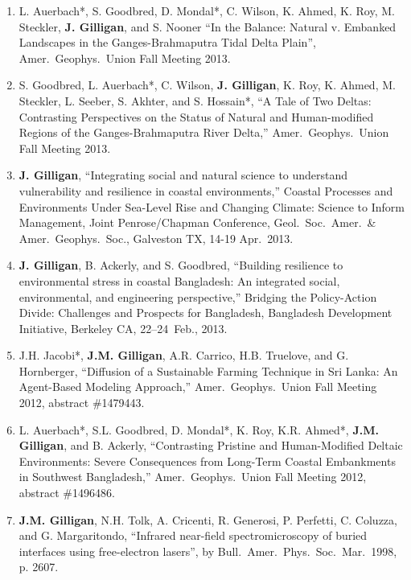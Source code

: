 \begin{enumerate}
    \item L. Auerbach*, S. Goodbred, D. Mondal*, C. Wilson, K. Ahmed, K. Roy, M. Steckler, \textbf{J. Gilligan}, and S. Nooner
    \enquote{In the Balance: Natural v. Embanked Landscapes in the Ganges-Brahmaputra Tidal Delta Plain},
    Amer.\ Geophys.\ Union Fall Meeting 2013.
    
    \item S. Goodbred, L. Auerbach*, C. Wilson, \textbf{J. Gilligan}, K. Roy, K. Ahmed, M. Steckler, L. Seeber, S. Akhter, and S. Hossain*,
    \enquote{A Tale of Two Deltas: Contrasting Perspectives on the Status of Natural and Human-modified Regions of the Ganges-Brahmaputra River Delta,}
    Amer.\ Geophys.\ Union Fall Meeting 2013.
    
    \item \textbf{J. Gilligan},
    \enquote{Integrating social and natural science to understand vulnerability and resilience in coastal environments,}
    Coastal Processes and Environments Under Sea-Level Rise and Changing Climate: Science to Inform Management, Joint Penrose/Chapman Conference,
    Geol.\ Soc.\ Amer.\ \& Amer.\ Geophys.\ Soc., Galveston TX, 14-19 Apr.~2013.
    
    \item \textbf{J. Gilligan}, B. Ackerly, and S. Goodbred,
    \enquote{Building resilience to environmental stress in coastal Bangladesh: An integrated social, environmental, and engineering perspective,}
    Bridging the Policy-Action Divide: Challenges and Prospects for Bangladesh, Bangladesh Development Initiative, Berkeley CA, 22--24~Feb., 2013.

    \item J.H. Jacobi*, \textbf{J.M. Gilligan}, A.R. Carrico, H.B. Truelove, and G. Hornberger,
    \enquote{Diffusion of a Sustainable Farming Technique in Sri Lanka: An Agent-Based Modeling Approach,}
    Amer.\ Geophys.\ Union Fall Meeting 2012, abstract \#1479443.

    \item
    L. Auerbach*, S.L. Goodbred, D. Mondal*, K. Roy, K.R. Ahmed*, \textbf{J.M. Gilligan}, and B. Ackerly,
    \enquote{Contrasting Pristine and Human-Modified Deltaic Environments: Severe Consequences from Long-Term Coastal Embankments in Southwest Bangladesh,}
    Amer.\ Geophys.\ Union Fall Meeting 2012, abstract \#1496486.
  
    \item \textbf{J.M. Gilligan}, N.H. Tolk, A. Cricenti, R. Generosi, P. Perfetti, C. Coluzza, and G. Margaritondo, 
    \enquote{Infrared near-field spectromicroscopy of buried interfaces using free-electron lasers}, by
    Bull.\ Amer.\ Phys.\ Soc.\ Mar.~1998, p. 2607.


\end{enumerate}
